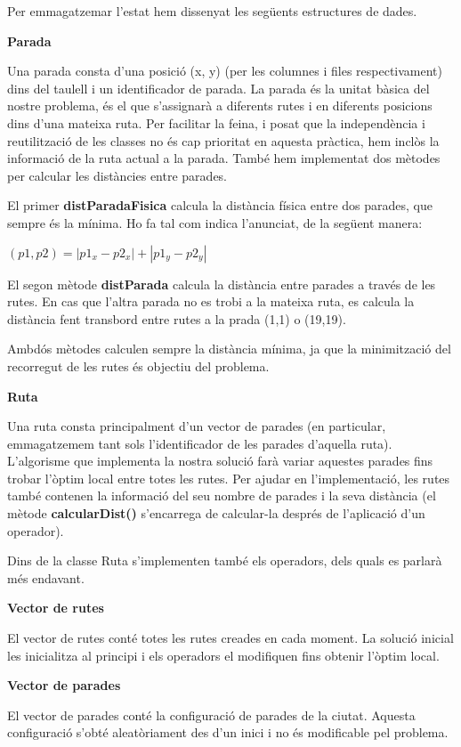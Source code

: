 Per emmagatzemar l'estat hem dissenyat les següents estructures de dades.

\textbf{Parada}

Una parada consta d'una posició (x, y) (per les columnes i files respectivament) dins del taulell i un identificador de parada. La parada és la unitat bàsica del nostre problema, és el que s'assignarà a diferents rutes i en diferents posicions dins d'una mateixa ruta. Per facilitar la feina, i posat que la independència i reutilització de les classes no és cap prioritat en aquesta pràctica, hem inclòs la informació de la ruta actual a la parada. També hem implementat dos mètodes per calcular les distàncies entre parades. 

El primer \textbf{distParadaFisica} calcula la distància física entre dos parades, que sempre és la mínima. Ho fa tal com indica l'anunciat, de la següent manera:

\begin{center}
$(p1,p2)=|p1_{x} - p2_{x}|+|p1_{y} - p2_{y}|$ 
\end{center}

El segon mètode \textbf{distParada} calcula la distància entre parades a través de les rutes. En cas que l'altra parada no es trobi a la mateixa ruta, es calcula la distància fent transbord entre rutes a la prada (1,1) o (19,19).

Ambdós mètodes calculen sempre la distància mínima, ja que la minimització del recorregut de les rutes és objectiu del problema.

\textbf{Ruta}

Una ruta consta principalment d'un vector de parades (en particular, emmagatzemem tant sols l'identificador de les parades d'aquella ruta). L'algorisme que implementa la nostra solució farà variar aquestes parades fins trobar l'òptim local entre totes les rutes. Per ajudar en l'implementació, les rutes també contenen la informació del seu nombre de parades i la seva distància (el mètode \textbf{calcularDist()} s'encarrega de calcular-la després de l'aplicació d'un operador).

Dins de la classe Ruta s'implementen també els operadors, dels quals es parlarà més endavant.

\textbf{Vector de rutes}

El vector de rutes conté totes les rutes creades en cada moment. La solució inicial les inicialitza al principi i els operadors el modifiquen fins obtenir l'òptim local.

\textbf{Vector de parades}

El vector de parades conté la configuració de parades de la ciutat. Aquesta configuració s'obté aleatòriament des d'un inici i no és modificable pel problema.

